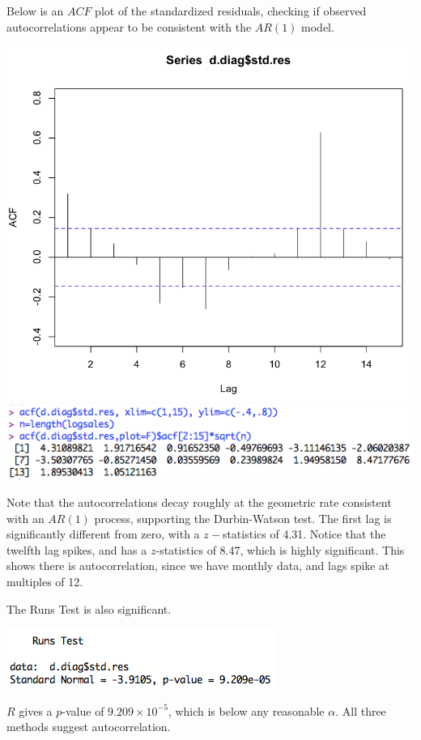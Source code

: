 \documentclass[a4 paper, 11 pt]{article}
\begin{document}
Below is an $ACF$ plot of the standardized residuals, checking if observed autocorrelations appear to be consistent with the $AR(1)$ model.
\begin{center}
\includegraphics[scale=0.4]{ACF} 
\includegraphics[scale=0.5]{ACFz}
\end{center}
Note that the autocorrelations decay roughly at the geometric rate consistent with an $AR(1)$ process, supporting the Durbin-Watson test. The first lag is significantly different from zero, with a $z-$statistics of 4.31. Notice that the twelfth lag spikes, and has a $z$-statistics of 8.47, which is highly significant. This shows there is autocorrelation, since we have monthly data, and lags spike at multiples of 12.

The Runs Test is also significant.
\begin{center}
\includegraphics[scale=0.6]{runs}
\end{center}
$R$ gives a $p$-value of $9.209 \times 10^{-5}$, which is below any reasonable $\alpha$. All three methods suggest autocorrelation.
\end{document}
